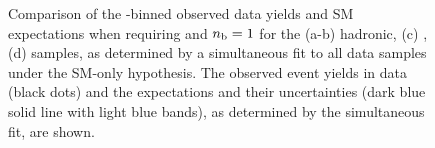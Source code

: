 \begin{figure}[t!]
\begin{center}
{    } 
    \caption{\label{fig:best-fit-ge4j1b} Comparison of the
      \scalht-binned observed data yields and SM expectations when
      requiring \njethigh and $n_{\text{b}} = 1$ for the (a-b) hadronic, (c)
      \mj, (d) \gj samples, as determined by a
      simultaneous fit to all data samples under the SM-only
      hypothesis. The observed event yields in data (black dots) and
      the expectations and their uncertainties (dark blue solid line
      with light blue bands), as determined by the simultaneous fit,
      are shown. 
      }
  \end{center}
\end{figure}

